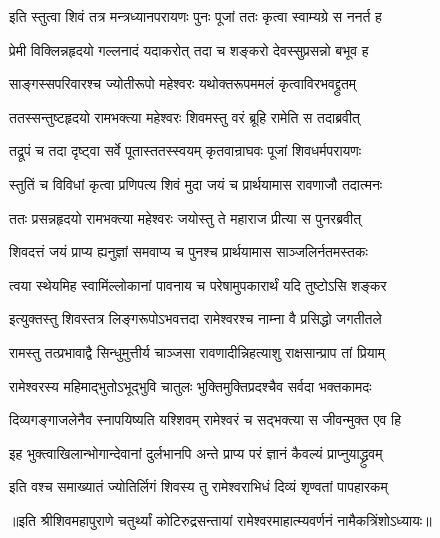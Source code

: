 \twolineshloka
{इति स्तुत्वा शिवं तत्र मन्त्रध्यानपरायणः}
{पुनः पूजां ततः कृत्वा स्वाम्यग्रे स ननर्त ह} %

\twolineshloka
{प्रेमी विक्लिन्नहृदयो गल्लनादं यदाकरोत्} 
{तदा च शङ्करो देवस्सुप्रसन्नो बभूव ह} %

\twolineshloka
{साङ्गस्सपरिवारश्च ज्योतीरूपो महेश्वरः}
{यथोक्तरूपममलं कृत्वाविरभवद्द्रुतम्} %

\twolineshloka
{ततस्सन्तुष्टहृदयो रामभक्त्या महेश्वरः} 
{शिवमस्तु वरं ब्रूहि रामेति स तदाब्रवीत्} %

\twolineshloka
{तद्रूपं च तदा दृष्ट्वा सर्वे पूतास्ततस्स्वयम्} 
{कृतवान्राघवः पूजां शिवधर्मपरायणः} %

\twolineshloka
{स्तुतिं च विविधां कृत्वा प्रणिपत्य शिवं मुदा} 
{जयं च प्रार्थयामास रावणाजौ तदात्मनः} %

\twolineshloka
{ततः प्रसन्नहृदयो रामभक्त्या महेश्वरः} 
{जयोस्तु ते महाराज प्रीत्या स पुनरब्रवीत्} %

\twolineshloka
{शिवदत्तं जयं प्राप्य ह्यनुज्ञां समवाप्य च} 
{पुनश्च प्रार्थयामास साञ्जलिर्नतमस्तकः} %


\twolineshloka
{त्वया स्थेयमिह स्वामिंल्लोकानां पावनाय च} 
{परेषामुपकारार्थं यदि तुष्टोऽसि शङ्कर} %


\twolineshloka
{इत्युक्तस्तु शिवस्तत्र लिङ्गरूपोऽभवत्तदा} 
{रामेश्वरश्च नाम्ना वै प्रसिद्धो जगतीतले} %

\twolineshloka
{रामस्तु तत्प्रभावाद्वै सिन्धुमुत्तीर्य चाञ्जसा}
{रावणादीन्निहत्याशु राक्षसान्प्राप तां प्रियाम्} %

\twolineshloka
{रामेश्वरस्य महिमाद्भुतोऽभूद्भुवि चातुलः} 
{भुक्तिमुक्तिप्रदश्चैव सर्वदा भक्तकामदः} %

\twolineshloka
{दिव्यगङ्गाजलेनैव स्नापयिष्यति यश्शिवम्} 
{रामेश्वरं च सद्भक्त्या स जीवन्मुक्त एव हि} %

\twolineshloka
{इह भुक्त्वाखिलान्भोगान्देवानां दुर्लभानपि} 
{अन्ते प्राप्य परं ज्ञानं कैवल्यं प्राप्नुयाद्ध्रुवम्} %

\twolineshloka
{इति वश्च समाख्यातं ज्योतिर्लिगं शिवस्य तु}
{रामेश्वराभिधं दिव्यं शृण्वतां पापहारकम्} %

॥इति श्रीशिवमहापुराणे चतुर्थ्यां कोटिरुद्रसन्तायां रामेश्वरमाहात्म्यवर्णनं नामैकत्रिंशोऽध्यायः॥

\closesection